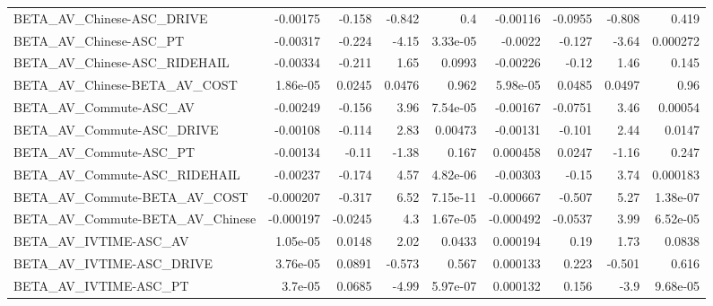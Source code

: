 \begin{tabular}{lrrrrrrrr}
BETA\_AV\_Chinese-ASC\_DRIVE                          &    -0.00175 &       -0.158 &   -0.842 &      0.4 &   -0.00116 &     -0.0955 &       -0.808 &         0.419 \\
BETA\_AV\_Chinese-ASC\_PT                             &    -0.00317 &       -0.224 &    -4.15 & 3.33e-05 &    -0.0022 &      -0.127 &        -3.64 &      0.000272 \\
BETA\_AV\_Chinese-ASC\_RIDEHAIL                       &    -0.00334 &       -0.211 &     1.65 &   0.0993 &   -0.00226 &       -0.12 &         1.46 &         0.145 \\
BETA\_AV\_Chinese-BETA\_AV\_COST                       &    1.86e-05 &       0.0245 &   0.0476 &    0.962 &   5.98e-05 &      0.0485 &       0.0497 &          0.96 \\
BETA\_AV\_Commute-ASC\_AV                             &    -0.00249 &       -0.156 &     3.96 & 7.54e-05 &   -0.00167 &     -0.0751 &         3.46 &       0.00054 \\
BETA\_AV\_Commute-ASC\_DRIVE                          &    -0.00108 &       -0.114 &     2.83 &  0.00473 &   -0.00131 &      -0.101 &         2.44 &        0.0147 \\
BETA\_AV\_Commute-ASC\_PT                             &    -0.00134 &        -0.11 &    -1.38 &    0.167 &   0.000458 &      0.0247 &        -1.16 &         0.247 \\
BETA\_AV\_Commute-ASC\_RIDEHAIL                       &    -0.00237 &       -0.174 &     4.57 & 4.82e-06 &   -0.00303 &       -0.15 &         3.74 &      0.000183 \\
BETA\_AV\_Commute-BETA\_AV\_COST                       &   -0.000207 &       -0.317 &     6.52 & 7.15e-11 &  -0.000667 &      -0.507 &         5.27 &      1.38e-07 \\
BETA\_AV\_Commute-BETA\_AV\_Chinese                    &   -0.000197 &      -0.0245 &      4.3 & 1.67e-05 &  -0.000492 &     -0.0537 &         3.99 &      6.52e-05 \\
BETA\_AV\_IVTIME-ASC\_AV                              &    1.05e-05 &       0.0148 &     2.02 &   0.0433 &   0.000194 &        0.19 &         1.73 &        0.0838 \\
BETA\_AV\_IVTIME-ASC\_DRIVE                           &    3.76e-05 &       0.0891 &   -0.573 &    0.567 &   0.000133 &       0.223 &       -0.501 &         0.616 \\
BETA\_AV\_IVTIME-ASC\_PT                              &     3.7e-05 &       0.0685 &    -4.99 & 5.97e-07 &   0.000132 &       0.156 &         -3.9 &      9.68e-05 \\

\end{tabular}
